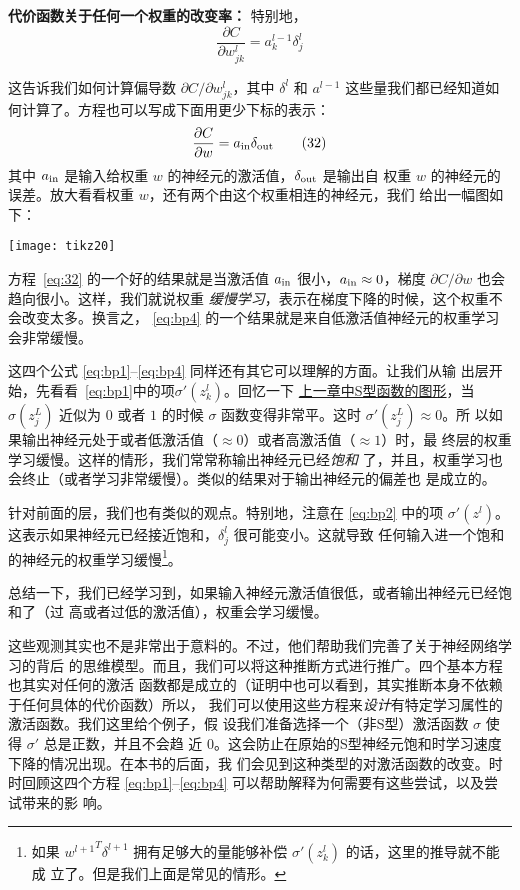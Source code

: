 \textbf{代价函数关于任何一个权重的改变率：} 特别地，
\begin{equation}
  \frac{\partial C}{\partial w^l_{jk}} = a^{l-1}_k \delta^l_j
  \label{eq:bp4}\tag{BP4}
\end{equation}

这告诉我们如何计算偏导数 $\partial C/\partial w_{jk}^l$，其中 $\delta^l$ 和
$a^{l-1}$ 这些量我们都已经知道如何计算了。方程也可以写成下面用更少下标的表示：
\begin{equation}
  \frac{\partial
    C}{\partial w} = a_{\rm in} \delta_{\rm out}
  \label{eq:32}\tag{32}
\end{equation}
其中 $a_{\rm in}$ 是输入给权重 $w$ 的神经元的激活值，$\delta_{\rm out}$ 是输出自
权重 $w$ 的神经元的误差。放大看看权重 $w$，还有两个由这个权重相连的神经元，我们
给出一幅图如下：

\begin{center}
  \texttt{[image: tikz20]}
\end{center}

方程~\eqref{eq:32} 的一个好的结果就是当激活值 $a_{\rm in}$ 很小，$a_{\rm in}
\approx 0$，梯度 $\partial C/\partial w$ 也会趋向很小。这样，我们就说权重%
\emph{缓慢学习}，表示在梯度下降的时候，这个权重不会改变太多。换言之，
\eqref{eq:bp4} 的一个结果就是来自低激活值神经元的权重学习会非常缓慢。

这四个公式 \eqref{eq:bp1}--\eqref{eq:bp4} 同样还有其它可以理解的方面。让我们从输
出层开始，先看看~\eqref{eq:bp1}中的项$\sigma'(z_k^l)$。回忆一下%
\hyperref[fig:StepFunction]{上一章中S型函数的图形}，当 $\sigma(z^L_j)$ 近似为
$0$ 或者 $1$ 的时候 $\sigma$ 函数变得非常平。这时 $\sigma'(z^L_j) \approx 0$。所
以如果输出神经元处于或者低激活值（$\approx 0$）或者高激活值（$\approx 1$）时，最
终层的权重学习缓慢。这样的情形，我们常常称输出神经元已经\emph{饱和}
了，并且，权重学习也会终止（或者学习非常缓慢）。类似的结果对于输出神经元的偏差也
是成立的。

针对前面的层，我们也有类似的观点。特别地，注意在 \eqref{eq:bp2} 中的项
$\sigma'(z^l)$。这表示如果神经元已经接近饱和，$\delta_j^l$ 很可能变小。这就导致
任何输入进一个饱和的神经元的权重学习缓慢\footnote{如果 ${w^{l+1}}^T
  \delta^{l+1}$ 拥有足够大的量能够补偿 $\sigma'(z_k^l)$ 的话，这里的推导就不能成
  立了。但是我们上面是常见的情形。}。

总结一下，我们已经学习到，如果输入神经元激活值很低，或者输出神经元已经饱和了（过
  高或者过低的激活值），权重会学习缓慢。

这些观测其实也不是非常出于意料的。不过，他们帮助我们完善了关于神经网络学习的背后
的思维模型。而且，我们可以将这种推断方式进行推广。四个基本方程也其实对任何的激活
函数都是成立的（证明中也可以看到，其实推断本身不依赖于任何具体的代价函数）所以，
我们可以使用这些方程来\emph{设计}有特定学习属性的激活函数。我们这里给个例子，假
设我们准备选择一个（非S型）激活函数 $\sigma$ 使得 $\sigma'$ 总是正数，并且不会趋
近 $0$。这会防止在原始的S型神经元饱和时学习速度下降的情况出现。在本书的后面，我
们会见到这种类型的对激活函数的改变。时时回顾这四个方程
\eqref{eq:bp1}--\eqref{eq:bp4} 可以帮助解释为何需要有这些尝试，以及尝试带来的影
响。


